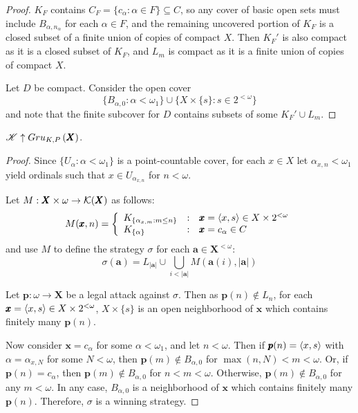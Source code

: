 \begin{proof}
  $K_F$ contains $C_F=\{c_\alpha: \alpha\in F\}\subseteq C$, so any
  cover of basic open sets must include $B_{\alpha,n_\alpha}$ for each
  $\alpha\in F$, and the remaining uncovered portion of $K_F$ is a closed
  subset of a finite union of copies of compact $X$. Then $K_F'$ is also
  compact as it is a closed subset of $K_F$, and $L_m$ is compact as it
  is a finite union of copies of compact $X$.

  Let $D$ be compact. Consider the open cover
    \[
      \{
        B_{\alpha,0}
      :
        \alpha<\omega_1
      \}
      \cup
      \{
        X\times\{s\}
      :
        s\in 2^{<\omega}
      \}
    \]
  and note that the finite subcover for $D$ contains subsets of some
  $K_F' \cup L_m$.
\end{proof}

\begin{thm}
  $\mathscr{K}\uparrow Gru_{K,P}\left({\pmb X}\right)$.
\end{thm}

\begin{proof}
  Since $\{U_\alpha:\alpha<\omega_1\}$ is a point-countable cover,
  for each $x\in X$ let $\alpha_{x,n}<\omega_1$ yield
  ordinals such that $x\in U_{\alpha_{x,n}}$ for $n<\omega$.

  Let $M:\pmb X\times \omega\to \mathcal{K}(\pmb X)$ as follows:
    \[
      M(\pmb x,n)
        =
      \left\{
        \begin{array}{lcl}
          K_{\{\alpha_{x,m}:m\leq n\}}
        & : &
          \pmb x = \langle x,s\rangle \in X\times 2^{<\omega}
        \\
          K_{\{\alpha\}}
        & : &
          \pmb x = c_\alpha \in C
        \end{array}
      \right.
    \]
  and use $M$ to define the strategy $\sigma$ for each $\pmb a\in\pmb X^{<\omega}$:
    \[
      \sigma(\pmb a)
        =
      L_{|\pmb a|}
        \cup
      \bigcup_{i< |\pmb a|}
      M(\pmb a(i),|\pmb a|)
    \]

  Let $\pmb p:\omega\to\pmb X$ be a legal attack against $\sigma$. Then as
  $\pmb p(n)\not\in L_n$, for each $\pmb x=\langle x,s\rangle\in X\times 2^{<\omega}$,
  $X\times\{s\}$ is an open neighborhood of $\pmb x$ which contains finitely
  many $\pmb p(n)$.

  Now consider $\pmb x=c_\alpha$ for some $\alpha<\omega_1$, and let $n<\omega$.
  Then if $\pmb p(n)=\langle x,s\rangle$ with $\alpha = \alpha_{x,N}$ for some $N<\omega$,
  then $\pmb p(m)\not\in B_{\alpha,0}$ for $\max(n,N)<m<\omega$.
  Or, if $\pmb p(n)=c_\alpha$, then
  $\pmb p(m)\not\in B_{\alpha,0}$ for $n<m<\omega$.
  Otherwise, $\pmb p(m)\not\in B_{\alpha,0}$ for any $m<\omega$.
  In any case, $B_{\alpha,0}$ is a neighborhood of $\pmb x$ which contains finitely
  many $\pmb p(n)$. Therefore, $\sigma$ is a winning strategy.
\end{proof}


